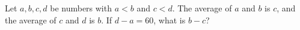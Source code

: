 Let $a,b,c,d$ be numbers with $a<b$ and $c<d$. The average of $a$ and $b$ is $c$, and the average of $c$ and $d$ is $b$. If $d-a=60$, what is $b-c$?
